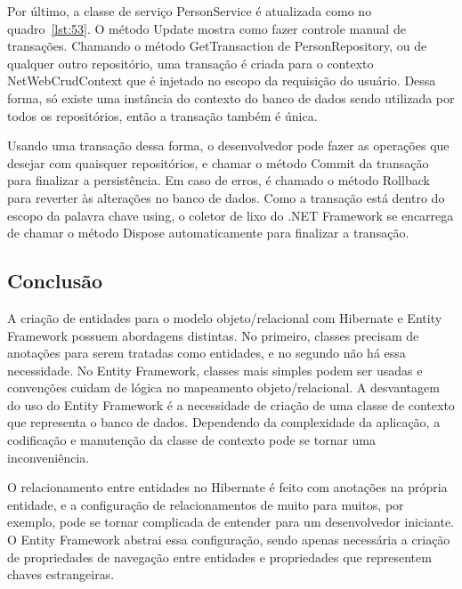 \documentclass[a4paper,12pt]{article}
\newcommand{\sharpcode}[3] {
	
	\FloatBarrier
}
\begin{document}
\sharpcode{code/52.txt}{Configuração de injeção de repositórios no projeto ASP.NET MVC}{lst:52}

Por último, a classe de serviço PersonService é atualizada como no quadro~\ref{lst:53}. O método Update mostra como fazer controle manual de transações. Chamando o método GetTransaction de PersonRepository, ou de qualquer outro repositório, uma transação é criada para o contexto NetWebCrudContext que é injetado no escopo da requisição do usuário. Dessa forma, só existe uma instância do contexto do banco de dados sendo utilizada por todos os repositórios, então a transação também é única.

Usando uma transação dessa forma, o desenvolvedor pode fazer as operações que desejar com quaisquer repositórios, e chamar o método Commit da transação para finalizar a persistência. Em caso de erros, é chamado o método Rollback para reverter às alterações no banco de dados. Como a transação está dentro do escopo da palavra chave using, o coletor de lixo do .NET Framework se encarrega de chamar o método Dispose automaticamente para finalizar a transação.

\sharpcode{code/53.txt}{Classe PersonService utilizando ambos os repositórios no projeto ASP.NET MVC}{lst:53}

\subsection{Conclusão}

A criação de entidades para o modelo objeto/relacional com Hibernate e Entity Framework possuem abordagens distintas. No primeiro, classes precisam de anotações para serem tratadas como entidades, e no segundo não há essa necessidade. No Entity Framework, classes mais simples podem ser usadas e convenções cuidam de lógica no mapeamento objeto/relacional. A desvantagem do uso do Entity Framework é a necessidade de criação de uma classe de contexto que representa o banco de dados. Dependendo da complexidade da aplicação, a codificação e manutenção da classe de contexto pode se tornar uma inconveniência.

O relacionamento entre entidades no Hibernate é feito com anotações na própria entidade, e a configuração de relacionamentos de muito para muitos, por exemplo, pode se tornar complicada de entender para um desenvolvedor iniciante. O Entity Framework abstrai essa configuração, sendo apenas necessária a criação de propriedades de navegação entre entidades e propriedades que representem chaves estrangeiras.
\end{document}
